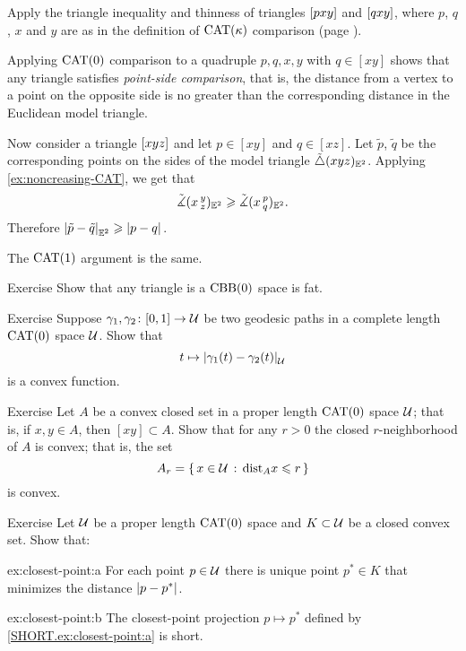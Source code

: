Apply  the triangle inequality and thinness of triangles $[pxy]$ and $[qxy]$, where $p$, $q$, $x$ and $y$ are as in the definition of $\mathrm{CAT}(\kappa)$ comparison (page \pageref{page:CAT-comparison}).

Applying $\mathrm{CAT}(0)$ comparison to a quadruple $p,q,x,y$ with $q\in [xy]$ shows that any triangle satisfies \emph{point-side comparison}, that is, the distance from a vertex to a  point on the opposite side is no greater than the corresponding distance in the Euclidean model triangle.  

Now consider a triangle $[xyz]$ and let $p\in [xy]$ and $q\in [xz]$.
Let $\tilde p$, $\tilde q$ be the corresponding points on the sides of the model triangle $\tilde\triangle({x}{y}{z})_{\mathbb{E}^2}$.
Applying \ref{ex:noncreasing-CAT}, we get that
\[\tilde\measuredangle(x\,{}^{y}_{z})_{\mathbb{E}^2} \geqslant \tilde\measuredangle(x\,{}^{p}_{q}) _{\mathbb{E}^2}.\]
Therefore $ \dist{\tilde p}{\tilde q}{\EE^2}\ge \dist{p}{q}{}$.

The $\mathrm{CAT}(1)$ argument is the same.
\qeds

\begin{thm}{Exercise}\label{ex:fat-triangle}
Show that any triangle is a $\mathrm{CBB}(0)$ space is fat. 
\end{thm}

\begin{thm}{Exercise}\label{ex:convex-dist}
Suppose $\gamma_1,\gamma_2\colon[0,1]\to \mathcal{U}$ be two geodesic paths in a complete length $\mathrm{CAT}(0)$ space $\mathcal{U}$.
Show that
\[t\mapsto\dist{\gamma_1(t)}{\gamma_2(t)}{\spc{U}}\]
is a convex function.
\end{thm}

\begin{thm}{Exercise}\label{ex:convex-nbhd}
Let $A$ be a convex closed set in a proper length $\mathrm{CAT}(0)$ space $\mathcal{U}$;
that is, if $x,y\in A$, then $[xy]\subset A$.
Show that for any $r>0$ the closed $r$-neighborhood of $A$ is convex;
that is, the set
\[A_r=\left\{\,{x\in \mathcal{U}}\,:\,{\mathrm{dist}_Ax\leqslant r}\,\right\}\]
is convex.
\end{thm}

\begin{thm}{Exercise}\label{ex:closest-point}
Let  $\mathcal{U}$ be a proper length $\mathrm{CAT}(0)$ space 
and $K\subset \mathcal{U}$ be a closed convex set.
Show that: 

\begin{subthm}{ex:closest-point:a}
For each point $p\in \mathcal{U}$ there is unique point $p^*\in K$ that minimizes the distance $\dist{p}{p^*}{}$.
\end{subthm}

\begin{subthm}{ex:closest-point:b}
The closest-point projection $p\mapsto p^*$ defined by \ref{SHORT.ex:closest-point:a} is short. 
\end{subthm}

\end{thm}

